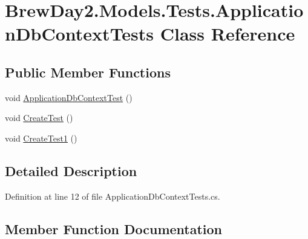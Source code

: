 \hypertarget{class_brew_day2_1_1_models_1_1_tests_1_1_application_db_context_tests}{}\section{Brew\+Day2.\+Models.\+Tests.\+Application\+Db\+Context\+Tests Class Reference}
\label{class_brew_day2_1_1_models_1_1_tests_1_1_application_db_context_tests}
\subsection*{Public Member Functions}
\begin{DoxyCompactItemize}
\item 
void \mbox{\hyperlink{class_brew_day2_1_1_models_1_1_tests_1_1_application_db_context_tests_aff2bbca09c561556a879881bae7305ad}{Application\+Db\+Context\+Test}} ()
\item 
void \mbox{\hyperlink{class_brew_day2_1_1_models_1_1_tests_1_1_application_db_context_tests_ad6b4a8e8cf994e2b04bc9e85746f0fb5}{Create\+Test}} ()
\item 
void \mbox{\hyperlink{class_brew_day2_1_1_models_1_1_tests_1_1_application_db_context_tests_a6817c07604ea89f72f77f18a60aab877}{Create\+Test1}} ()
\end{DoxyCompactItemize}


\subsection{Detailed Description}


Definition at line 12 of file Application\+Db\+Context\+Tests.\+cs.



\subsection{Member Function Documentation}
\mbox{\label{class_brew_day2_1_1_models_1_1_tests_1_1_application_db_context_tests_aff2bbca09c561556a879881bae7305ad}} 
